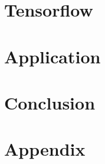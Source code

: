 \documentclass[a4paper, 12pt, oneside, onecolumn, final, openany]{report}
\begin{document}
    \chapter{Tensorflow}
    

    \chapter{Application}
    

    \chapter{Conclusion}
    

    \newpage

    
    

    \chapter{Appendix}
    
\end{document}
